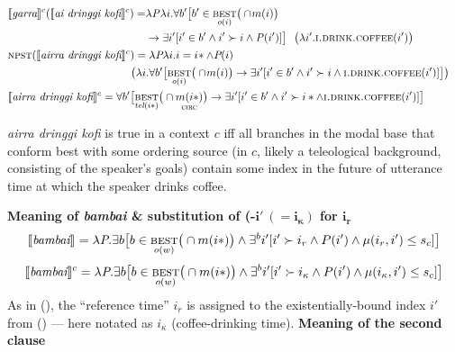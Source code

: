 \begin{align*}
&\begin{aligned}\denote[c]{\textit{garra}}(\denote[c]{\textit{ai dringgi kofi}}) =&\lambda\mathit P\lambda i.\forall b'\big[b'\in\underset{o(i)}{\textsc{best}}\big(\cap\!m(i)\big)\\&\to\exists i'[i'\in b'\wedge i'\succ i\wedge\mathit P(i')]\big]~~\big(\lambda i'.\textsc{i.drink.coffee}(i')\big)\end{aligned}\\
&\begin{aligned}\textsc{npst}(\denote[c]{\textit{airra dringgi kofi}})=\lambda\textit{P}\lambda i.i=i\!*\wedge\textit{P}(i)\\
	\big(\lambda i.\forall b'\big[\underset{o(i)}{\textsc{best}}\big(\cap\!m(i)\big)&\to\exists i'[i'\in b'\wedge i'\succ i\wedge\textsc{i.drink.coffee}(i')]\big]\big) \end{aligned}\\
&\begin{aligned}	\denote[c]{\textit{airra dringgi kofi}}=\forall b'\big[\underset{\textit{tel}(i*)}{\textsc{best}}\big(\cap\underset{\textsc{circ}}{m(i*)}\big)&\to\exists i'[i'\in b'\wedge i'\succ i*\wedge\textsc{i.drink.coffee}(i')]\big]\end{aligned}
\end{align*}

\textit{airra dringgi kofi} is true in a context $ c $ iff all branches in the modal base that conform best with some ordering source (in $ c $, likely a teleological background, consisting of the speaker's goals) contain some index in the future of utterance time at which the speaker drinks coffee.%

\a \textbf{Meaning of \textit{bambai} \& substitution of  (-$\boldsymbol{i'\ (=i_\kappa)}$ for $ \boldsymbol{i_r} $}
$$\begin{multlined}
	\denote{\textit{bambai}}=\lambda\textit{P}.\exists b
	\big[b\in\underset{o(w)}{\textsc{best}}\big(\cap m(i*)\big)\wedge \exists ^bi'[i'\succ i_r\wedge P(i')\wedge\mu(i_r,i')\leq s_c]\big]\end{multlined}$$
$$\begin{multlined}	\denote[c]{\textit{bambai}}=\lambda\textit{P}.\exists b
	\big[b\in\underset{o(w)}{\textsc{best}}\big(\cap m(i*)\big)\wedge \exists ^bi'[i'\succ i_\kappa\wedge P(i')\wedge\mu(i_\kappa,i')\leq s_c]\big]
\end{multlined}$$
As in (), the ``reference time'' $i_r$ is assigned to the existentially-bound index $ i' $ from () --- here notated as $ i_\kappa $ (coffee-drinking time).
\a\textbf{Meaning of the second clause}

